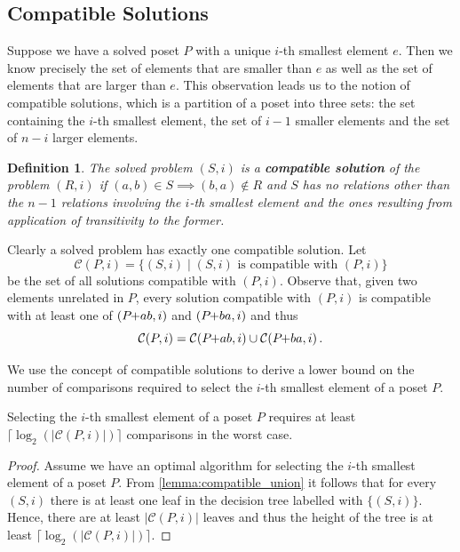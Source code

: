 \documentclass[twoside,leqno,twocolumn]{article}
\newcommand{\pchild}[3]{{#1}\kern-1pt{+}{#2}{#3}}
\newtheorem{definition}{Definition}[section]
\begin{document}
\subsection{Compatible Solutions}

Suppose we have a solved poset $P$ with a unique $i$-th smallest element $e$.
Then we know precisely the set of elements that are smaller than $e$ as well as the set of elements that are larger than $e$.
This observation leads us to the notion of compatible solutions, which is a partition of a poset into three sets: the set containing the $i$-th smallest element, the set of $i-1$ smaller elements and the set of $n-i$ larger elements.

\begin{definition}%
  The solved problem $(S, i)$ is a \textbf{compatible solution} of the problem $(R, i)$ if $(a, b)\in S\implies (b, a)\notin R$ and $S$ has no relations other than the $n - 1$ relations involving the $i$-th smallest element and the ones resulting from application of transitivity to the former.
\end{definition}

Clearly a solved problem has exactly one compatible solution.
Let
\begin{equation*}
  \mathcal{C}(P, i) = \{(S, i) \mid (S, i) \text{ is compatible with } (P, i) \}
\end{equation*}
be the set of all solutions compatible with $(P, i)$.
Observe that, given two elements unrelated in $P$, every solution compatible with $(P, i)$ is compatible with at least one of $(\pchild{P}{a}{b}, i)$ and $(\pchild{P}{b}{a}, i)$ and thus
\begin{equation}\label{lemma:compatible_union}
  \mathcal{C}(P, i) = \mathcal{C}(\pchild{P}{a}{b}, i) \cup \mathcal{C}(\pchild{P}{b}{a}, i)\,\text{.}
\end{equation}

We use the concept of compatible solutions to derive a lower bound on the number of comparisons required to select the $i$-th smallest element of a poset $P$.

\begin{theorem}\label{theorem:compatible_log}
  Selecting the $i$-th smallest element of a poset $P$ requires at least $\lceil\log_2(|\mathcal{C}(P, i)|)\rceil$ comparisons in the worst case.
\end{theorem}

\begin{proof}
  Assume we have an optimal algorithm for selecting the $i$-th smallest element of a poset $P$.
  From \eqref{lemma:compatible_union} it follows that for every $(S, i)$ there is at least one leaf in the decision tree labelled with $\{(S, i)\}$.
  Hence, there are at least $|\mathcal{C}(P, i)|$ leaves and thus the height of the tree is at least $\lceil\log_2(|\mathcal{C}(P, i)|)\rceil$.
\end{proof}
\end{document}
